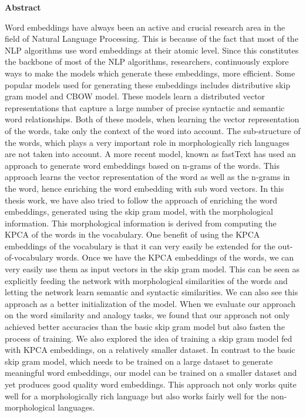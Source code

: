 \thispagestyle{empty}

\centerline{\Large{\textbf{Abstract}}}

\vspace{2cm}
Word embeddings have always been an active and crucial research area in the field of Natural Language Processing. This is because of the fact that most of the NLP algorithms use word embeddings at their atomic level. Since this constitutes the backbone of most of the NLP algorithms, researchers, continuously explore ways to make the models which generate these embeddings, more efficient. Some popular models used for generating these embeddings includes distributive skip gram model and CBOW model. These models learn a distributed vector representations that capture a large number of precise syntactic and semantic word relationships. Both of these models, when learning the vector representation of the words, take only the context of the word into account. The sub-structure of the words, which plays a very important role in morphologically rich languages are not taken into account. A more recent model, known as fastText has used an approach to generate word embeddings based on n-grams of the words. This approach learns the vector representation of the word as well as the n-grams in the word, hence enriching the word embedding with sub word vectors.
In this thesis work, we have also tried to follow the approach of enriching the word embeddings, generated using the skip gram model, with the morphological information. This morphological information is derived from computing the KPCA of the words in the vocabulary. One benefit of using the KPCA embeddings of the vocabulary is that it can very easily be extended for the out-of-vocabulary words. Once we have the KPCA embeddings of the words, we can very easily use them as input vectors in the skip gram model. This can be seen as explicitly feeding the network with morphological similarities of the words and letting the network learn semantic and syntactic similarities. We can also see this approach as a better initialization of the model. When we evaluate our approach on the word similarity and analogy tasks, we found that our approach not only achieved better accuracies than the basic skip gram model but also fasten the process of training. We also explored the idea of training a skip gram model fed with KPCA embeddings, on a relatively smaller dataset. In contrast to the basic skip gram model, which needs to be trained on a large dataset to generate meaningful word embeddings, our model can be trained on a smaller dataset and yet produces good quality word embeddings. This approach not only works quite well for a morphologically rich language but also works fairly well for the non-morphological languages. 
\newpage
\thispagestyle{empty}
\rule{0cm}{5cm}